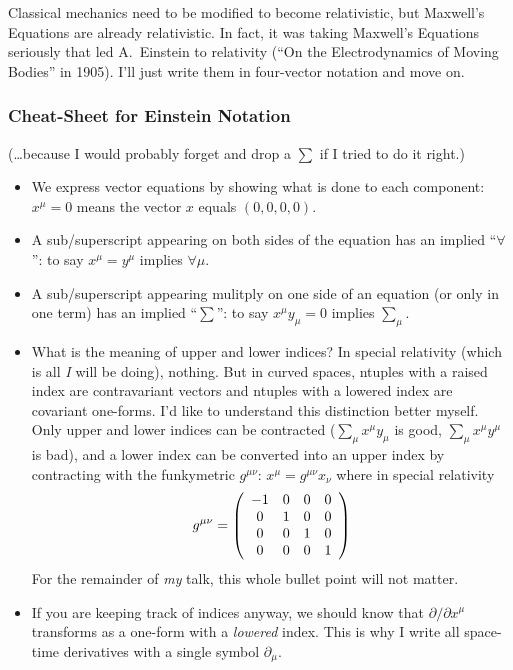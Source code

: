 \documentclass[12pt]{article}
\begin{document}
Classical mechanics need to be modified to become relativistic, but
Maxwell's Equations are already relativistic.  In fact, it was taking
Maxwell's Equations seriously that led A.\ Einstein to relativity
(``On the Electrodynamics of Moving Bodies'' in 1905).  I'll just
write them in four-vector notation and move on.

\subsubsection{Cheat-Sheet for Einstein Notation}

(\ldots because I would probably forget and drop a $\sum$ if I tried
to do it right.)
\begin{itemize}

  \item We express vector equations by showing what is done to each
  component: $x^\mu = 0$ means the vector $x$ equals $(0,0,0,0)$.

  \item A sub/superscript appearing on both sides of the equation has
  an implied ``$\forall$'': to say $x^\mu = y^\mu$ implies $\forall
  \mu$.

  \item A sub/superscript appearing mulitply on one side of an
  equation (or only in one term) has an implied ``$\sum$'': to say
  $x^\mu y_\mu = 0$ implies $\displaystyle \sum_\mu$.

  \item What is the meaning of upper and lower indices?  In special
  relativity (which is all {\it I} will be doing), nothing.  But in
  curved spaces, ntuples with a raised index are contravariant vectors
  and ntuples with a lowered index are covariant one-forms.  I'd like
  to understand this distinction better myself.  Only upper and lower
  indices can be contracted ($\sum_\mu x^\mu y_\mu$ is good, $\sum_\mu
  x^\mu y^\mu$ is bad), and a lower index can be converted into an
  upper index by contracting with the funkymetric $g^{\mu\nu}$: $x^\mu =
  g^{\mu\nu} x_\nu$ where in special relativity
\begin{equation}
  g^{\mu\nu} = \left(\begin{array}{c c c c}
-1 & 0 & 0 & 0 \\
0 & 1 & 0 & 0 \\
0 & 0 & 1 & 0 \\
0 & 0 & 0 & 1 \end{array}\right)
\end{equation}
  For the remainder of {\it my} talk, this whole bullet point will not
  matter.

  \item If you are keeping track of indices anyway, we should know
  that $\partial/\partial x^\mu$ transforms as a one-form with a {\it
  lowered} index.  This is why I write all space-time derivatives with
  a single symbol $\partial_\mu$.

\end{itemize}
\end{document}
